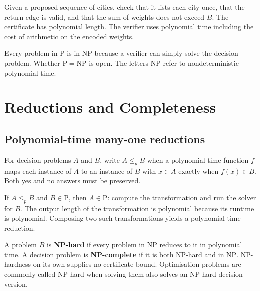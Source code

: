 \documentclass[12pt,a4paper]{article}
\begin{document}
\begin{tcolorbox}[examplebox, title={Verifying the decision version of TSP}]
Given a proposed sequence of cities, check that it lists each city once, that the return edge is valid, and that the sum of weights does not exceed $B$. The certificate has polynomial length. The verifier uses polynomial time including the cost of arithmetic on the encoded weights.
\end{tcolorbox}

Every problem in $\mathrm{P}$ is in $\mathrm{NP}$ because a verifier can simply solve the decision problem. Whether $\mathrm{P}=\mathrm{NP}$ is open. The letters NP refer to nondeterministic polynomial time.

\section{Reductions and Completeness}
\subsection{Polynomial-time many-one reductions}
\begin{tcolorbox}[defbox, title={Polynomial-time reduction}]
For decision problems $A$ and $B$, write $A\le_p B$ when a polynomial-time function $f$ maps each instance of $A$ to an instance of $B$ with $x\in A$ exactly when $f(x)\in B$. Both yes and no answers must be preserved.
\end{tcolorbox}

\begin{tcolorbox}[tikzbox, title={Direction of a polynomial-time reduction}]
\centering
{}\par
\end{tcolorbox}

If $A\le_p B$ and $B\in\mathrm P$, then $A\in\mathrm P$: compute the transformation and run the solver for $B$. The output length of the transformation is polynomial because its runtime is polynomial. Composing two such transformations yields a polynomial-time reduction.
\begin{tcolorbox}[defbox, title={NP-hard and NP-complete}]
A problem $B$ is \textbf{NP-hard} if every problem in $\mathrm{NP}$ reduces to it in polynomial time. A decision problem is \textbf{NP-complete} if it is both NP-hard and in $\mathrm{NP}$. NP-hardness on its own supplies no certificate bound. Optimisation problems are commonly called NP-hard when solving them also solves an NP-hard decision version.
\end{tcolorbox}
\end{document}
